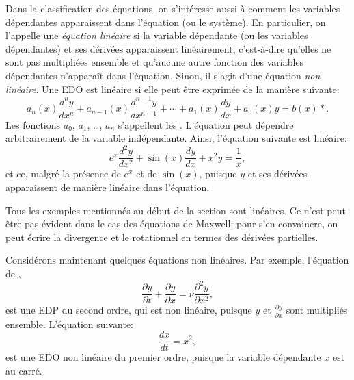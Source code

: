 Dans la classification des équations, on s'intéresse aussi à comment les variables dépendantes
apparaissent dans l'équation (ou le système).
En particulier, on l'appelle une \emph{équation linéaire}
si la variable dépendante (ou les variables dépendantes) et ses dérivées apparaissent linéairement,
c'est-à-dire qu'elles ne sont pas multipliées ensemble et qu'aucune autre fonction des variables dépendantes n'apparaît dans l'équation.
Sinon, il s'agit d'une équation \emph{non linéaire}.
Une EDO est linéaire si elle peut être exprimée de la manière suivante:
\begin{equation} \label{classification:eqlingen}
a_n(x) \frac{d^n y}{dx^n}
	+ a_{n-1}(x) \frac{d^{n-1} y}{dx^{n-1}}
	+ \cdots
	+ a_{1}(x) \frac{dy}{dx}
	+ a_{0}(x) y
	= b(x) *.
\end{equation}
Les fonctions $a_0$, $a_1$, \ldots, $a_n$ s'appellent les \emph{}.
L'équation peut dépendre arbitrairement de la variable indépendante.
Ainsi, l'équation suivante est linéaire:
\begin{equation} \label{classification:eqlinex}
	e^x \frac{d^2 y}{dx^2} + \sin(x) \frac{d y}{dx} +  x^2 y = \frac{1}{x},
\end{equation}
et ce, malgré la présence de $e^x$ et de $\sin(x)$, puisque $y$ et ses dérivées apparaissent de manière linéaire dans l'équation.

Tous les exemples mentionnés au début de la section sont linéaires.
Ce n'est peut-être pas évident dans le cas des équations de Maxwell;
pour s'en convaincre, on peut écrire la divergence et le rotationnel en termes des dérivées partielles.

Considérons maintenant quelques équations non linéaires.
Par exemple, l'équation de ,
\begin{equation*}
	\frac{\partial y}{\partial t} +  \frac{\partial y}{\partial x}
	= \nu \frac{\partial^2 y}{\partial x^2},
\end{equation*}
est une EDP du second ordre, qui est non linéaire, puisque $y$ et $\frac{\partial y}{\partial x}$ sont multipliés ensemble.
L'équation suivante:
\begin{equation} \label{classification:eqnonlinode}
	\frac{dx}{dt} = x^2,
\end{equation}
est une EDO non linéaire du premier ordre, puisque la variable dépendante $x$ est au carré.

\medskip

